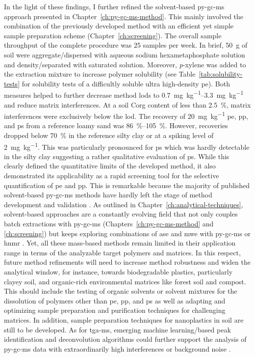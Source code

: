 In the light of these findings, I further refined the solvent-based \ac{py-gc-ms} approach presented in Chapter~\ref{ch:py-gc-ms-method}. This mainly involved the combination of the previously developed method with an efficient yet simple sample preparation scheme (Chapter~\ref{ch:screening}). The overall sample throughput of the complete procedure was \num{25} samples per week.
In brief, \SI{50}{\gram} of soil were aggregate\-/dispersed with aqueous sodium hexametaphosphate solution and density\-/separated with saturated  solution. Moreover, \textit{p}-xylene was added to the extraction mixture to increase polymer solubility (see Table~\ref{tab:solubility-tests} for solubility tests of a difficultly soluble ultra high-density \ac{pe}). Both measures helped to further decrease method \acp{lod} to \SIrange{0.7}{3.3}{\milli\gram\per\kilo\gram} and reduce matrix interferences. At a soil \ac{Corg} content of less than \SI{2.5}{\percent}, matrix interferences were exclusively below the \ac{lod}. The recovery of \SI{20}{\milli\gram\per\kilo\gram} \ac{pe}, \ac{pp}, and \ac{ps} from a reference loamy sand was \SIrange{86}{105}{\percent}. However, recoveries dropped below \SI{70}{\percent} in the reference silty clay or at a spiking level of \SI{2}{\milli\gram\per\kilo\gram}. This was particularly pronounced for \ac{ps} which was hardly detectable in the silty clay suggesting a rather qualitative evaluation of \ac{ps}.
While this clearly defined the quantitative limits of the developed method, it also demonstrated its applicability as a rapid screening tool for the selective quantification of \ac{pe} and \ac{pp}. This is remarkable because the majority of published solvent-based \ac{py-gc-ms} methods have hardly left the stage of method development and validation \citep{DierkesQuantification2019,OkoffoIdentification2020}. As outlined in Chapter~\ref{ch:analytical-techniques}, solvent-based approaches are a constantly evolving field that not only couples batch extractions with \ac{py-gc-ms} (Chapters~\ref{ch:py-gc-ms-method} and \ref{ch:screening}) but keeps exploring combinations of \ac{ase} and \ac{mwe} with \ac{py-gc-ms} or \ac{hnmr} \citep{OkoffoIdentification2020,HermabessiereMicrowaveAssisted2021,NelsonQuantification2019,PeezQuantitative2020}.
Yet, all these mass-based methods remain limited in their application range in terms of the analyzable target polymers and matrices. In this respect, future method refinements will need to increase method robustness and widen the analytical window, for instance, towards biodegradable plastics, particularly clayey soil, and organic-rich environmental matrices like forest soil and compost. This should include the testing of organic solvents or solvent mixtures for the dissolution of polymers other than \ac{pe}, \ac{pp}, and \ac{ps} as well as adapting and optimizing sample preparation and purification techniques for challenging matrices. In addition, sample preparation techniques for nanoplastics in soil are still to be developed. As for \ac{tga-ms}, emerging machine learning\-/based peak identification and deconvolution algorithms could further support the analysis of \ac{py-gc-ms} data with extraordinarily high interferences or background noise \citep{CowgerCritical2020,MatsuiIdentification2020}.
